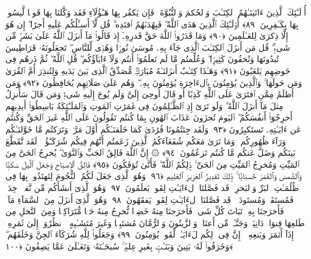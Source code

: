  أُو۟لَـٰٓئِكَ ٱلَّذِينَ ءَاتَينَـٰهُمُ ٱلكِتَـٰبَ وَٱلحُكمَ وَٱلنُّبُوَّةَ ۚ فَإِن يَكفُر بِهَا هَـٰٓؤُلَآءِ فَقَد وَكَّلنَا بِهَا قَومًۭا لَّيسُوا۟ بِهَا بِكَـٰفِرِينَ ﴿٨٩﴾
 أُو۟لَـٰٓئِكَ ٱلَّذِينَ هَدَى ٱللَّهُ ۖ فَبِهُدَىٰهُمُ ٱقتَدِه ۗ قُل لَّآ أَسـَٔلُكُم عَلَيهِ أَجرًا ۖ إِن هُوَ إِلَّا ذِكرَىٰ لِلعَـٰلَمِينَ ﴿٩٠﴾
 وَمَا قَدَرُوا۟ ٱللَّهَ حَقَّ قَدرِهِۦٓ إِذ قَالُوا۟ مَآ أَنزَلَ ٱللَّهُ عَلَىٰ بَشَرٍۢ مِّن شَىءٍۢ ۗ قُل مَن أَنزَلَ ٱلكِتَـٰبَ ٱلَّذِى جَآءَ بِهِۦ مُوسَىٰ نُورًۭا وَهُدًۭى لِّلنَّاسِ ۖ تَجعَلُونَهُۥ قَرَاطِيسَ تُبدُونَهَا وَتُخفُونَ كَثِيرًۭا ۖ وَعُلِّمتُم مَّا لَم تَعلَمُوٓا۟ أَنتُم وَلَآ ءَابَآؤُكُم ۖ قُلِ ٱللَّهُ ۖ ثُمَّ ذَرهُم فِى خَوضِهِم يَلعَبُونَ ﴿٩١﴾
 وَهَـٰذَا كِتَـٰبٌ أَنزَلنَـٰهُ مُبَارَكٌۭ مُّصَدِّقُ ٱلَّذِى بَينَ يَدَيهِ وَلِتُنذِرَ أُمَّ ٱلقُرَىٰ وَمَن حَولَهَا ۚ وَٱلَّذِينَ يُؤمِنُونَ بِٱلءَاخِرَةِ يُؤمِنُونَ بِهِۦ ۖ وَهُم عَلَىٰ صَلَاتِهِم يُحَافِظُونَ ﴿٩٢﴾
 وَمَن أَظلَمُ مِمَّنِ ٱفتَرَىٰ عَلَى ٱللَّهِ كَذِبًا أَو قَالَ أُوحِىَ إِلَىَّ وَلَم يُوحَ إِلَيهِ شَىءٌۭ وَمَن قَالَ سَأُنزِلُ مِثلَ مَآ أَنزَلَ ٱللَّهُ ۗ وَلَو تَرَىٰٓ إِذِ ٱلظَّـٰلِمُونَ فِى غَمَرَٰتِ ٱلمَوتِ وَٱلمَلَـٰٓئِكَةُ بَاسِطُوٓا۟ أَيدِيهِم أَخرِجُوٓا۟ أَنفُسَكُمُ ۖ ٱليَومَ تُجزَونَ عَذَابَ ٱلهُونِ بِمَا كُنتُم تَقُولُونَ عَلَى ٱللَّهِ غَيرَ ٱلحَقِّ وَكُنتُم عَن ءَايَـٰتِهِۦ تَستَكبِرُونَ ﴿٩٣﴾
 وَلَقَد جِئتُمُونَا فُرَٰدَىٰ كَمَا خَلَقنَـٰكُم أَوَّلَ مَرَّةٍۢ وَتَرَكتُم مَّا خَوَّلنَـٰكُم وَرَآءَ ظُهُورِكُم ۖ وَمَا نَرَىٰ مَعَكُم شُفَعَآءَكُمُ ٱلَّذِينَ زَعَمتُم أَنَّهُم فِيكُم شُرَكَـٰٓؤُا۟ ۚ لَقَد تَّقَطَّعَ بَينَكُم وَضَلَّ عَنكُم مَّا كُنتُم تَزعُمُونَ ﴿٩٤﴾
 ۞ إِنَّ ٱللَّهَ فَالِقُ ٱلحَبِّ وَٱلنَّوَىٰ ۖ يُخرِجُ ٱلحَىَّ مِنَ ٱلمَيِّتِ وَمُخرِجُ ٱلمَيِّتِ مِنَ ٱلحَىِّ ۚ ذَٟلِكُمُ ٱللَّهُ ۖ فَأَنَّىٰ تُؤفَكُونَ ﴿٩٥﴾
 فَالِقُ ٱلإِصبَاحِ وَجَعَلَ ٱلَّيلَ سَكَنًۭا وَٱلشَّمسَ وَٱلقَمَرَ حُسبَانًۭا ۚ ذَٟلِكَ تَقدِيرُ ٱلعَزِيزِ ٱلعَلِيمِ ﴿٩٦﴾
 وَهُوَ ٱلَّذِى جَعَلَ لَكُمُ ٱلنُّجُومَ لِتَهتَدُوا۟ بِهَا فِى ظُلُمَـٰتِ ٱلبَرِّ وَٱلبَحرِ ۗ قَد فَصَّلنَا ٱلءَايَـٰتِ لِقَومٍۢ يَعلَمُونَ ﴿٩٧﴾
 وَهُوَ ٱلَّذِىٓ أَنشَأَكُم مِّن نَّفسٍۢ وَٟحِدَةٍۢ فَمُستَقَرٌّۭ وَمُستَودَعٌۭ ۗ قَد فَصَّلنَا ٱلءَايَـٰتِ لِقَومٍۢ يَفقَهُونَ ﴿٩٨﴾
 وَهُوَ ٱلَّذِىٓ أَنزَلَ مِنَ ٱلسَّمَآءِ مَآءًۭ فَأَخرَجنَا بِهِۦ نَبَاتَ كُلِّ شَىءٍۢ فَأَخرَجنَا مِنهُ خَضِرًۭا نُّخرِجُ مِنهُ حَبًّۭا مُّتَرَاكِبًۭا وَمِنَ ٱلنَّخلِ مِن طَلعِهَا قِنوَانٌۭ دَانِيَةٌۭ وَجَنَّـٰتٍۢ مِّن أَعنَابٍۢ وَٱلزَّيتُونَ وَٱلرُّمَّانَ مُشتَبِهًۭا وَغَيرَ مُتَشَـٰبِهٍ ۗ ٱنظُرُوٓا۟ إِلَىٰ ثَمَرِهِۦٓ إِذَآ أَثمَرَ وَيَنعِهِۦٓ ۚ إِنَّ فِى ذَٟلِكُم لَءَايَـٰتٍۢ لِّقَومٍۢ يُؤمِنُونَ ﴿٩٩﴾
 وَجَعَلُوا۟ لِلَّهِ شُرَكَآءَ ٱلجِنَّ وَخَلَقَهُم ۖ وَخَرَقُوا۟ لَهُۥ بَنِينَ وَبَنَـٰتٍۭ بِغَيرِ عِلمٍۢ ۚ سُبحَـٰنَهُۥ وَتَعَـٰلَىٰ عَمَّا يَصِفُونَ ﴿١٠٠﴾
